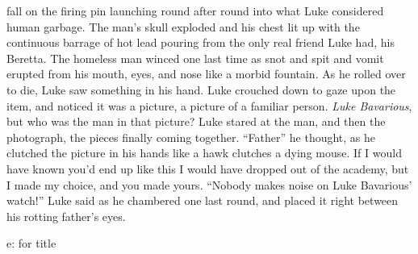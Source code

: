 fall on the firing pin launching round after round into what Luke
considered human garbage. The man's skull exploded and his chest lit up
with the continuous barrage of hot lead pouring from the only real
friend Luke had, his Beretta. The homeless man winced one last time as
snot and spit and vomit erupted from his mouth, eyes, and nose like a
morbid fountain. As he rolled over to die, Luke saw something in his
hand. Luke crouched down to gaze upon the item, and noticed it was a
picture, a picture of a familiar person.  {\em Luke Bavarious}, but who
was the man in that picture? Luke stared at the man, and then the
photograph, the pieces finally coming together. ``Father'' he thought,
as he clutched the picture in his hands like a hawk clutches a dying
mouse. If I would have known you'd end up like this I would have dropped
out of the academy, but I made my choice, and you made yours.  ``Nobody
makes noise on Luke Bavarious' watch!''  Luke said as he chambered one
last round, and placed it right between his rotting father's eyes.

e: for title 
 





